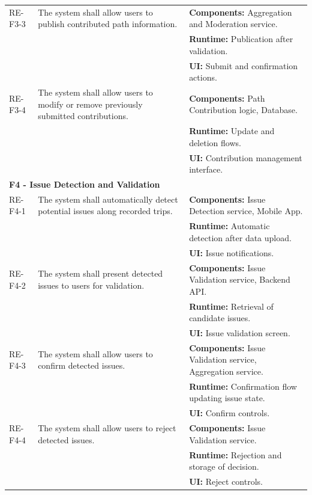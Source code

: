 \begin{longtable}{|p{2.4cm}|p{5.2cm}|p{7cm}|}
RE-F3-3 &
The system shall allow users to publish contributed path information. &
\textbf{Components:} Aggregation and Moderation service.\\
& & \textbf{Runtime:} Publication after validation.\\
& & \textbf{UI:} Submit and confirmation actions.\\
\hline

RE-F3-4 &
The system shall allow users to modify or remove previously submitted contributions. &
\textbf{Components:} Path Contribution logic, Database.\\
& & \textbf{Runtime:} Update and deletion flows.\\
& & \textbf{UI:} Contribution management interface.\\
\hline


\multicolumn{3}{|l|}{\textbf{F4 - Issue Detection and Validation}}\\
\hline
RE-F4-1 &
The system shall automatically detect potential issues along recorded trips. &
\textbf{Components:} Issue Detection service, Mobile App.\\
& & \textbf{Runtime:} Automatic detection after data upload.\\
& & \textbf{UI:} Issue notifications.\\
\hline

RE-F4-2 &
The system shall present detected issues to users for validation. &
\textbf{Components:} Issue Validation service, Backend API.\\
& & \textbf{Runtime:} Retrieval of candidate issues.\\
& & \textbf{UI:} Issue validation screen.\\
\hline

RE-F4-3 &
The system shall allow users to confirm detected issues. &
\textbf{Components:} Issue Validation service, Aggregation service.\\
& & \textbf{Runtime:} Confirmation flow updating issue state.\\
& & \textbf{UI:} Confirm controls.\\
\hline

RE-F4-4 &
The system shall allow users to reject detected issues. &
\textbf{Components:} Issue Validation service.\\
& & \textbf{Runtime:} Rejection and storage of decision.\\
& & \textbf{UI:} Reject controls.\\
\hline


\end{longtable}
